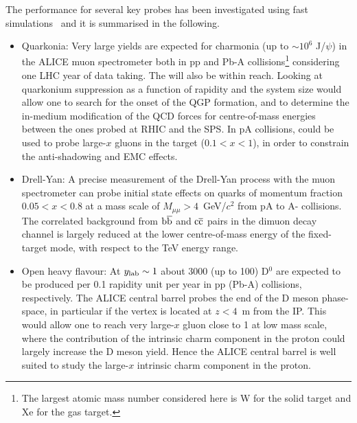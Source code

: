 \documentclass[../report.tex]{subfiles}
\begin{document}
The performance for several key probes has been investigated using fast simulations~\cite{Hadjidakis:2018ifr} and it is summarised in the following.
\begin{itemize}
\item{Quarkonia: Very large yields are expected for charmonia (up to $\sim 10^{6}$ J/$\psi$) in the ALICE muon spectrometer both in pp and Pb-A collisions\footnote{The largest atomic mass number considered here is W for the solid target and Xe for the gas target.} considering one LHC year of data taking. The  will also be within reach. Looking at quarkonium suppression as a function of rapidity and the system size would allow one to search for the onset of the QGP formation, and to determine the in-medium modification of the QCD forces for centre-of-mass energies between the ones probed at RHIC and the SPS. In pA collisions,  could be used to probe large-$x$ gluons in the target ($0.1<x<1$), in order to constrain the anti-shadowing and EMC effects.}

\item{Drell-Yan: A precise measurement of the Drell-Yan process with the muon spectrometer can probe initial state effects on quarks of momentum fraction $0.05<x<0.8$ at a mass scale of $M_{\mu\mu}> 4$~GeV/$c^2$ from pA to A- collisions. The correlated background from $\rm b\overline{b}$ and $\rm c\overline{c}$ pairs in the dimuon decay channel is largely reduced at the lower centre-of-mass energy of the fixed-target mode, with respect to the TeV energy range.}

\item{Open heavy flavour: At $y_{\rm lab} \sim 1$ about 3000 (up to 100) D$^{0}$ are expected to be produced per 0.1 rapidity unit per year in pp (Pb-A) collisions, respectively. The ALICE central barrel probes the end of the D meson phase-space, in particular if the vertex is located at $z < 4$~m from the IP. This would allow one to reach very large-$x$ gluon close to 1 at low mass scale, where the contribution of the intrinsic charm component in the proton could largely increase the D meson yield. Hence the ALICE central barrel is well suited to study the large-$x$ intrinsic charm component in the proton.}


\end{itemize}
\end{document}
